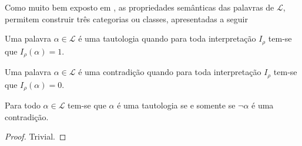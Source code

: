 Como muito bem exposto em \cite{edgar2002, nunes2008}, as propriedades semânticas das palavras de $\mathcal{L}$, permitem construir três categorias ou classes, apresentadas a seguir

\begin{definicao}[Tautologia]
  Uma palavra $\alpha \in \mathcal{L}$ é uma tautologia quando para toda interpretação $I_\rho$ tem-se que $I_\rho(\alpha) = 1$.
\end{definicao}

\begin{definicao}[Contradição]
  Uma palavra $\alpha \in \mathcal{L}$ é uma contradição quando para toda interpretação $I_\rho$ tem-se que $I_\rho(\alpha) = 0$.
\end{definicao}


\begin{proposicao}
  Para todo $\alpha \in \mathcal{L}$ tem-se que $\alpha$ é uma tautologia se e somente se $\neg \alpha$ é uma contradição.
\end{proposicao}

\begin{proof}
  Trivial.
\end{proof}

